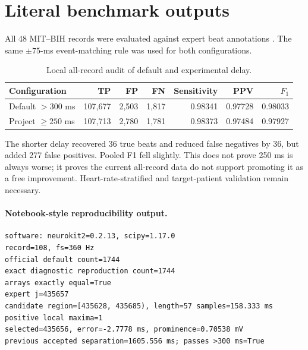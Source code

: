 \documentclass[11pt]{article}
\begin{document}
\clearpage
\section{Literal benchmark outputs}
All 48 MIT--BIH records were evaluated against expert beat annotations \cite{goldberger2000physiobank,moody2001mitbih,physionetmitdb}.  The same \(\pm75\)-ms event-matching rule was used for both configurations.

\begin{table}[H]
\centering
\caption{Local all-record audit of default and experimental delay.}
\begin{tabular}{@{}lrrrrrr@{}}
\toprule
Configuration & TP & FP & FN & Sensitivity & PPV & \(F_1\) \\
\midrule
Default \(>300\) ms & 107,677 & 2,503 & 1,817 & 0.98341 & 0.97728 & 0.98033 \\
Project \(\ge250\) ms & 107,713 & 2,780 & 1,781 & 0.98373 & 0.97484 & 0.97927 \\
\bottomrule
\end{tabular}
\end{table}
The shorter delay recovered 36 true beats and reduced false negatives by 36, but added 277 false positives.  Pooled F1 fell slightly.  This does not prove 250 ms is always worse; it proves the current all-record data do not support promoting it as a free improvement.  Heart-rate-stratified and target-patient validation remain necessary.

\paragraph{Notebook-style reproducibility output.}
\begin{lstlisting}
software: neurokit2=0.2.13, scipy=1.17.0
record=108, fs=360 Hz
official default count=1744
exact diagnostic reproduction count=1744
arrays exactly equal=True
expert j=435657
candidate region=[435628, 435685), length=57 samples=158.333 ms
positive local maxima=1
selected=435656, error=-2.7778 ms, prominence=0.70538 mV
previous accepted separation=1605.556 ms; passes >300 ms=True
\end{lstlisting}

\clearpage
\end{document}
